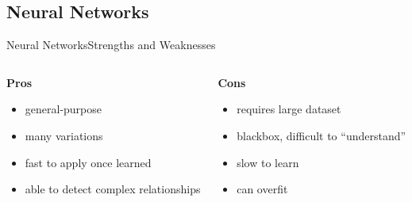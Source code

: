 \subsection{Neural Networks}
\begin{frame}{Neural Networks}{Strengths and Weaknesses \cite{tu-advantages-disadvantages-neural-networks}}
    \begin{columns}
        \begin{column}{0.5\textwidth}
            \textbf{Pros}
            \begin{itemize}
                \item general-purpose
                \item many variations
                \item fast to apply once learned
                \item able to detect complex relationships
            \end{itemize}
        \end{column}
        \begin{column}{0.5\textwidth}
            \textbf{Cons}
            \begin{itemize}
                \item requires large dataset
                \item blackbox\footnotemark[1], difficult to ``understand''
                \item slow to learn
                \item can overfit
            \end{itemize}
        \end{column}
    \end{columns}



\end{frame}

